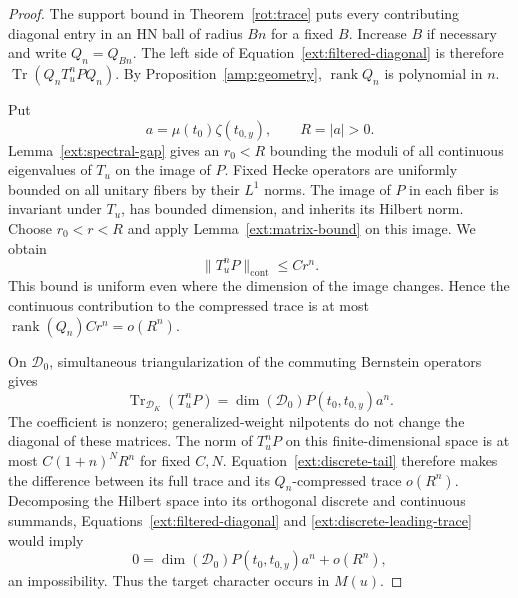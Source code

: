 \begin{proof}
 The support bound in Theorem~\ref{rot:trace} puts every contributing
 diagonal entry in an HN ball of radius $Bn$ for a fixed $B$.  Increase
 $B$ if necessary and write $Q_n=Q_{Bn}$.  The left side of
 Equation~\eqref{ext:filtered-diagonal} is therefore
 $\operatorname{Tr}(Q_nT_u^nP Q_n)$.  By
 Proposition~\ref{amp:geometry}, $\operatorname{rank}Q_n$ is polynomial
 in $n$.

 Put
 \[
     a=\mu(t_0)\zeta(t_{0,y}),\qquad R=|a|>0.
 \]
 Lemma~\ref{ext:spectral-gap} gives an $r_0<R$ bounding the moduli of
 all continuous eigenvalues of $T_u$ on the image of $P$.  Fixed Hecke
 operators are uniformly bounded on all unitary fibers by their
 $L^1$ norms.  The image of $P$ in each fiber is invariant under $T_u$,
 has bounded dimension, and inherits its Hilbert norm.  Choose
 $r_0<r<R$ and apply Lemma~\ref{ext:matrix-bound} on this image.
 We obtain
 \[
       \|T_u^nP\|_{\mathrm{cont}}\le C r^n.
 \]
 This bound is uniform even where the dimension of the image changes.
 Hence the continuous contribution to the compressed trace is at
 most $\operatorname{rank}(Q_n)Cr^n=o(R^n)$.

 On $\mathcal D_0$, simultaneous triangularization of the commuting
 Bernstein operators gives
 \begin{equation}\label{ext:discrete-leading-trace}
    \operatorname{Tr}_{\mathcal D_K}(T_u^nP)
        =\dim(\mathcal D_0)P(t_0,t_{0,y})a^n.
 \end{equation}
 The coefficient is nonzero; generalized-weight nilpotents do not
 change the diagonal of these matrices.  The norm of $T_u^nP$ on this
 finite-dimensional space is at most $C(1+n)^N R^n$ for fixed $C,N$.
 Equation~\eqref{ext:discrete-tail} therefore makes the difference
 between its full trace and its $Q_n$-compressed trace $o(R^n)$.
 Decomposing the Hilbert space into its orthogonal discrete and
 continuous summands, Equations~\eqref{ext:filtered-diagonal} and
 \eqref{ext:discrete-leading-trace} would imply
 \[
      0=\dim(\mathcal D_0)P(t_0,t_{0,y})a^n+o(R^n),
 \]
 an impossibility.  Thus the target character occurs in $M(u)$.


\end{proof}
